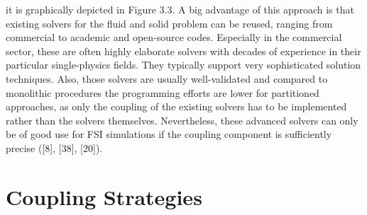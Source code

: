 it is graphically depicted in Figure 3.3. A big advantage of this approach is that existing solvers for
the fluid and solid problem can be reused, ranging from commercial to academic and open-source codes.
Especially in the commercial sector, these are often highly elaborate solvers with decades of experience in
their particular single-physics fields. They typically support very sophisticated solution techniques. Also,
those solvers are usually well-validated and compared to monolithic procedures the programming efforts
are lower for partitioned approaches, as only the coupling of the existing solvers has to be implemented
rather than the solvers themselves. Nevertheless, these advanced solvers can only be of good use for FSI
simulations if the coupling component is sufficiently precise ([8], [38], [20]).

\section{Coupling Strategies}
\label{sec:coupling}

